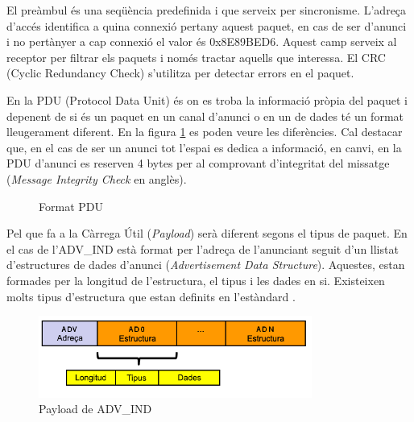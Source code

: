 El preàmbul és una seqüència predefinida i que serveix per sincronisme.
L'adreça d'accés identifica a quina connexió pertany aquest paquet, en cas de ser d'anunci i no pertànyer a cap connexió el valor és 0x8E89BED6.
Aquest camp serveix al receptor per filtrar els paquets i només tractar aquells que interessa.
El CRC (Cyclic Redundancy Check) s'utilitza per detectar errors en el paquet. 

En la PDU (Protocol Data Unit) és on es troba la informació pròpia del paquet i depenent de si és un paquet en un canal d'anunci o en un de dades té un format lleugerament diferent.
En la figura \ref{fig:pdu_format} es poden veure les diferències.
Cal destacar que, en el cas de ser un anunci tot l'espai es dedica a informació, en canvi, en la PDU d'anunci es reserven 4 bytes per al comprovant d'integritat del missatge (\textit{Message Integrity Check} en anglès).

\begin{figure}[!h]
	\begin{center}
		\begin{subfigmatrix}{1}
		\end{subfigmatrix}
	\end{center}
	\caption{Format PDU}
	\label{fig:pdu_format}
\end{figure}

Pel que fa a la Càrrega Útil (\textit{Payload}) serà diferent segons el tipus de paquet.
En el cas de l'ADV\_IND està format per l'adreça de l'anunciant seguit d'un llistat d'estructures de dades d'anunci (\textit{Advertisement Data Structure}).
Aquestes, estan formades per la longitud de l'estructura, el tipus i les dades en si.
Existeixen molts tipus d'estructura que estan definits en l'estàndard \cite{AD_Types}.

\begin{figure}[!h]
	\begin{center}
		\includegraphics[width=0.8\textwidth]{./images/adv-ind-packet.png}
		\caption{Payload de ADV\_IND \cite{BLE_4.2_packet_format}}
	\end{center}
\end{figure}

